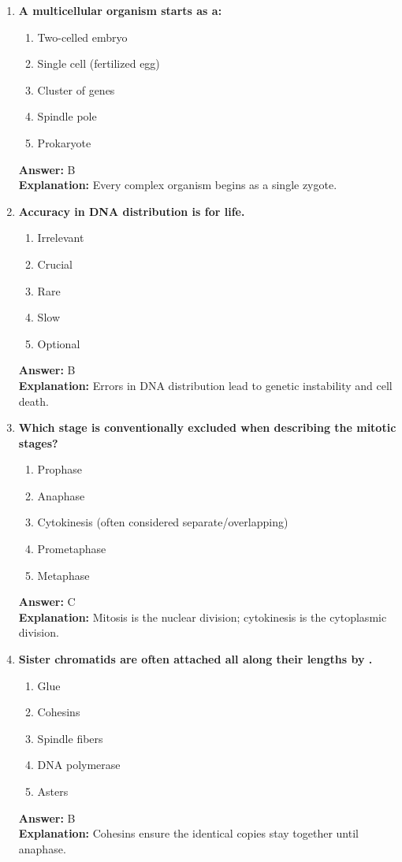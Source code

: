 \documentclass[11pt, a4paper]{article}
\begin{document}
\begin{enumerate}[leftmargin=*, label=\arabic*.]
\item \textbf{A multicellular organism starts as a:}
\begin{enumerate}[label=\Alph*.]
\item Two-celled embryo
\item Single cell (fertilized egg)
\item Cluster of genes
\item Spindle pole
\item Prokaryote
\end{enumerate}
\textbf{Answer:} B \\
\textbf{Explanation:} Every complex organism begins as a single zygote.

\item \textbf{Accuracy in DNA distribution is \underline{\hspace{1cm}} for life.}
\begin{enumerate}[label=\Alph*.]
\item Irrelevant
\item Crucial
\item Rare
\item Slow
\item Optional
\end{enumerate}
\textbf{Answer:} B \\
\textbf{Explanation:} Errors in DNA distribution lead to genetic instability and cell death.

\item \textbf{Which stage is conventionally excluded when describing the mitotic stages?}
\begin{enumerate}[label=\Alph*.]
\item Prophase
\item Anaphase
\item Cytokinesis (often considered separate/overlapping)
\item Prometaphase
\item Metaphase
\end{enumerate}
\textbf{Answer:} C \\
\textbf{Explanation:} Mitosis is the nuclear division; cytokinesis is the cytoplasmic division.

\item \textbf{Sister chromatids are often attached all along their lengths by \underline{\hspace{1cm}}.}
\begin{enumerate}[label=\Alph*.]
\item Glue
\item Cohesins
\item Spindle fibers
\item DNA polymerase
\item Asters
\end{enumerate}
\textbf{Answer:} B \\
\textbf{Explanation:} Cohesins ensure the identical copies stay together until anaphase.


\end{enumerate}
\end{document}
